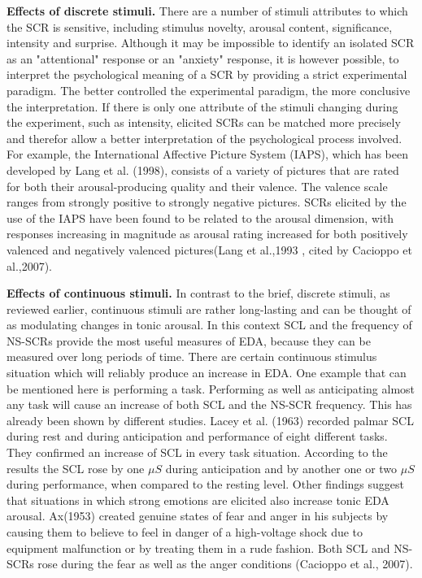 \textbf{Effects of discrete stimuli.} There are a number of stimuli attributes to which the SCR is sensitive, including stimulus novelty, arousal content, significance, intensity and surprise. Although it may be impossible to identify an isolated SCR as an "attentional" response or an "anxiety" response, it is however possible, to interpret the psychological meaning of a SCR by providing a strict experimental paradigm. The better controlled the experimental paradigm, the more conclusive the interpretation. If there is only one attribute of the stimuli changing during the experiment, such as intensity, elicited SCRs can be matched more precisely and therefor allow a better interpretation of the psychological process involved. For example, the International Affective Picture System (IAPS), which has been developed by Lang et al. (1998), consists of a variety of pictures that are rated for both their arousal-producing quality and their valence. The valence scale ranges from strongly positive to strongly negative pictures. SCRs elicited by the use of the IAPS have been found to be related to the arousal dimension, with responses increasing  in magnitude as arousal rating increased for both positively valenced and negatively valenced pictures(Lang et al.,1993 , cited by Cacioppo et al.,2007). 

\textbf{Effects of continuous stimuli.} In contrast to the brief, discrete stimuli, as reviewed earlier, continuous stimuli are rather long-lasting and can be thought of as modulating changes in tonic arousal. In this context SCL and the frequency of NS-SCRs provide the most useful measures of EDA, because they can be measured over long periods of time. There are certain continuous stimulus situation which will reliably produce an increase in EDA. One example that can be mentioned here is performing a task. Performing as well as anticipating almost any task will cause an increase of both SCL and the NS-SCR frequency. This has already been shown by different studies. Lacey et al. (1963) recorded palmar SCL during rest and during anticipation and performance of eight different tasks. They confirmed an increase of SCL in every task situation. According to the results the SCL rose by one $\mu S$ during anticipation and by another one or two $\mu S$ during performance, when compared to the resting level. Other findings suggest that situations in which strong emotions are elicited also increase tonic EDA arousal. Ax(1953) created genuine states of fear and anger in his subjects by causing them to believe to feel in danger of a high-voltage shock due to equipment malfunction or by treating them in a rude fashion. Both SCL and NS-SCRs rose during the fear as well as the anger conditions (Cacioppo et al., 2007). \\

